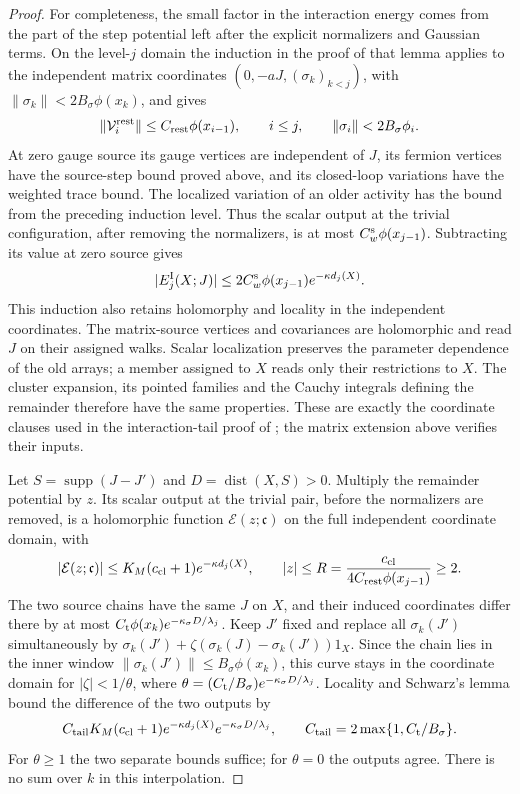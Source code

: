 \documentclass[11pt,letterpaper,reqno]{amsart}
\theoremstyle{definition}
\theoremstyle{remark}
\begin{document}
\begin{proof}
For completeness, the small factor in the interaction
energy comes from the part of the step potential left
after the explicit normalizers and Gaussian terms.
On the level-$j$ domain the induction in the proof of that
lemma applies to the independent matrix coordinates
$(0,-aJ,(\sigma_k)_{k<j})$, with
$\|\sigma_k\|<2B_\sigma\phi(x_k)$, and gives
\[
 \|\mathcal V_i^{\rm rest}\|
       \le C_{\rm rest}\phi(x_{i-1}),\qquad i\le j,
 \qquad \|\sigma_i\|<2B_\sigma\phi_i.
\]
At zero gauge source its gauge vertices are independent
of $J$, its fermion vertices have the source-step
bound proved above, and its closed-loop variations
have the weighted trace bound. The localized variation
of an older activity has the bound from the preceding
induction level. Thus the scalar output at the trivial
configuration, after removing the normalizers, is at
most $C_w^{\rm s}\phi(x_{j-1})$. Subtracting its value
at zero source gives
\begin{equation}\label{eq:qcdm2-current-interaction-energy}
 |E_j^{\rm I}(X;J)|
 \le2C_w^{\rm s}\phi(x_{j-1})e^{-\kappa d_j(X)}.
\end{equation}
This induction also retains holomorphy and locality in the
independent coordinates. The matrix-source vertices and
covariances are holomorphic and read $J$ on their assigned
walks. Scalar localization preserves the parameter dependence
of the old arrays; a member assigned to $X$ reads only their
restrictions to $X$. The cluster expansion, its pointed
families and the Cauchy integrals defining the remainder
therefore have the same properties. These are exactly the
coordinate clauses used in the interaction-tail proof of
\cite[Lem. 11.4]{QCDM1}; the matrix extension above verifies
their inputs.

Let $S=\operatorname{supp}(J-J')$ and
$D=\operatorname{dist}(X,S)>0$. Multiply the remainder
potential by $z$. Its scalar output at the trivial pair,
before the normalizers are removed, is a holomorphic
function $\mathcal E(z;\mathfrak c)$ on the full independent
coordinate domain, with
\[
 |\mathcal E(z;\mathfrak c)|
 \le K_M(c_{\rm cl}+1)e^{-\kappa d_j(X)},\qquad
 |z|\le R=\frac{c_{\rm cl}}{4C_{\rm rest}\phi(x_{j-1})}\ge2.
\]
The two source chains have the same $J$ on $X$, and
their induced coordinates differ there by at most
$C_{\rm t}\phi(x_k)e^{-\kappa_\sigma D/\lambda_j}$.
Keep $J'$ fixed and replace all $\sigma_k(J')$ simultaneously
by $\sigma_k(J')+\zeta(\sigma_k(J)-\sigma_k(J'))1_X$.
Since the chain lies in the inner window
$\|\sigma_k(J')\|\le B_\sigma\phi(x_k)$, this curve stays
in the coordinate domain for $|\zeta|<1/\theta$, where
$\theta=(C_{\rm t}/B_\sigma)e^{-\kappa_\sigma D/\lambda_j}$.
Locality and Schwarz's lemma bound the difference of the two
outputs by
\[
 C_{\rm tail}K_M(c_{\rm cl}+1)e^{-\kappa d_j(X)}
                e^{-\kappa_\sigma D/\lambda_j},\qquad
 C_{\rm tail}=2\max\{1,C_{\rm t}/B_\sigma\}.
\]
For $\theta\ge1$ the two separate bounds suffice; for
$\theta=0$ the outputs agree. There is no sum over $k$
in this interpolation.


\end{proof}
\end{document}
